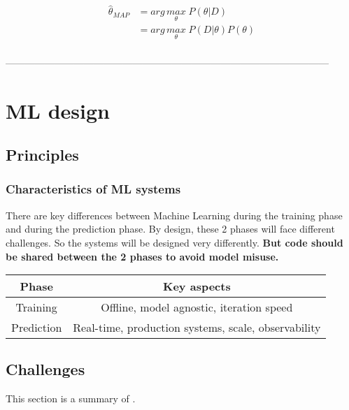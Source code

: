 \documentclass{report}
\begin{document}
\begin{align*}
    \hat{\theta}_{MAP} & = arg\,\underset{\theta}{max}\; P(\theta | D) \\
                       & = arg\,\underset{\theta}{max}\; P(D | \theta) P(\theta) \\
\end{align*}

---------------------------------------------------------------------------------------------------
\chapter{ML design}

\section{Principles}
\subsection{Characteristics of ML systems}
There are key differences between Machine Learning during the training phase and during the prediction phase.
By design, these 2 phases will face different challenges. So the systems will be designed very differently.
\textbf{But code should be shared between the 2 phases to avoid model misuse.}
\begin{center}
    \begin{tabular}{ |c|c|}
        \hline
        Phase & Key aspects \\
        \hline
        Training & Offline, model agnostic, iteration speed \\
        \hline
        Prediction & Real-time, production systems, scale, observability \\
        \hline
    \end{tabular}

\end{center}

\section{Challenges}
This section is a summary of \cite{tech-debt}.
\end{document}
